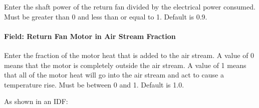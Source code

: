 Enter the shaft power of the return fan divided by the electrical power consumed. Must be greater than 0 and less than or equal to 1. Default is 0.9.

\paragraph{Field: Return Fan Motor in Air Stream Fraction}\label{field-return-fan-motor-in-air-stream-fraction-2}

Enter the fraction of the motor heat that is added to the air stream. A value of 0 means that the motor is completely outside the air stream. A value of 1 means that all of the motor heat will go into the air stream and act to cause a temperature rise. Must be between 0 and 1. Default is 1.0.

As shown in an IDF:

